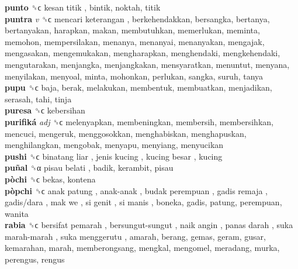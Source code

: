 \textbf{punto} ␝ϲ   kesan titik , bintik, noktah, titik  \\
\textbf{puntra} \emph{v}  ␝ϲ   mencari keterangan , berkehendakkan, bersangka, bertanya, bertanyakan, harapkan, makan, membutuhkan, memerlukan, meminta, memohon, mempersilakan, menanya, menanyai, menanyakan, mengajak, mengasakan, mengemukakan, mengharapkan, menghendaki, mengkehendaki, mengutarakan, menjangka, menjangkakan, mensyaratkan, menuntut, menyana, menyilakan, menyoal, minta, mohonkan, perlukan, sangka, suruh, tanya  \\
\textbf{pupu} ␝ϲ  baja, berak, melakukan, membentuk, membuatkan, menjadikan, serasah, tahi, tinja  \\
\textbf{puresa} ␝ϲ  kebersihan  \\
\textbf{purifiká} \emph{adj}  ␝ϲ  melenyapkan, membeningkan, membersih, membersihkan, mencuci, mengeruk, menggosokkan, menghabiskan, menghapuskan, menghilangkan, mengobak, menyapu, menyiang, menyucikan  \\
\textbf{pushi} ␝ϲ   binatang liar ,  jenis kucing ,  kucing besar , kucing  \\
\textbf{puñal} ␝α   pisau belati , badik, kerambit, pisau  \\
\textbf{pòchi} ␝ϲ  bekas, kontena  \\
\textbf{pòpchi} ␝ϲ   anak patung ,  anak-anak ,  budak perempuan ,  gadis remaja ,  gadis/dara ,  mak we ,  si genit ,  si manis , boneka, gadis, patung, perempuan, wanita  \\
\textbf{rabia} ␝ϲ   bersifat pemarah ,  bersungut-sungut ,  naik angin ,  panas darah ,  suka marah-marah ,  suka menggerutu , amarah, berang, gemas, geram, gusar, kemarahan, marah, memberongsang, mengkal, mengomel, meradang, murka, perengus, rengus  \\
